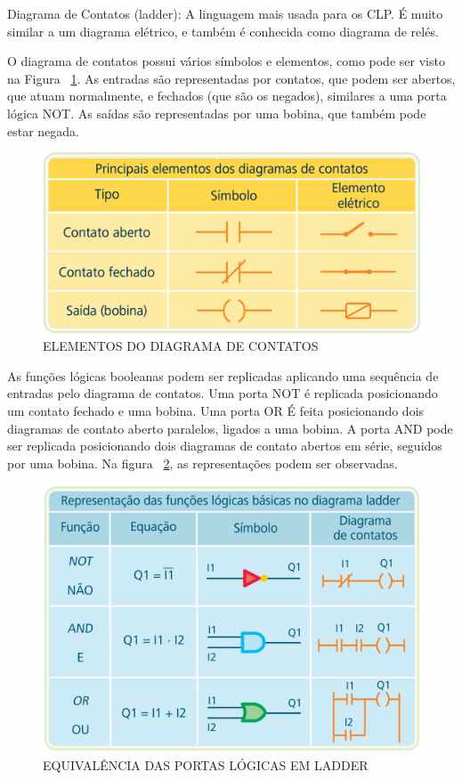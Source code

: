 \documentclass{article}
\begin{document}
Diagrama de Contatos (ladder): A linguagem mais usada para os CLP. É muito similar a um diagrama elétrico, e também é conhecida como diagrama de relés. 

 

O diagrama de contatos possui vários símbolos e elementos, como pode ser visto na Figura ~\ref{fig:elementos}. As entradas são representadas por contatos, que podem ser abertos, que atuam normalmente, e fechados (que são os negados), similares a uma porta lógica NOT. As saídas são representadas por uma bobina, que também pode estar negada.

\begin{figure}[h!]
    \centering
    \includegraphics[width=\textwidth]{imagens/elemdiagcont.png}
    \caption{ELEMENTOS DO DIAGRAMA DE CONTATOS}
    \label{fig:elementos}
\end{figure}

As funções lógicas booleanas podem ser replicadas aplicando uma sequência de entradas pelo diagrama de contatos. Uma porta NOT é replicada posicionando um contato fechado e uma bobina. Uma porta OR É feita posicionando dois diagramas de contato aberto paralelos, ligados a uma bobina. A porta AND pode ser replicada posicionando dois diagramas de contato abertos em série, seguidos por uma bobina. Na figura ~\ref{fig:equivalencia}, as representações podem ser observadas.


\begin{figure}[h!]
    \centering
    \includegraphics[width=\textwidth]{imagens/equivalportlogic.png}
    \caption{EQUIVALÊNCIA DAS PORTAS LÓGICAS EM LADDER}
    \label{fig:equivalencia}
\end{figure}
\end{document}
